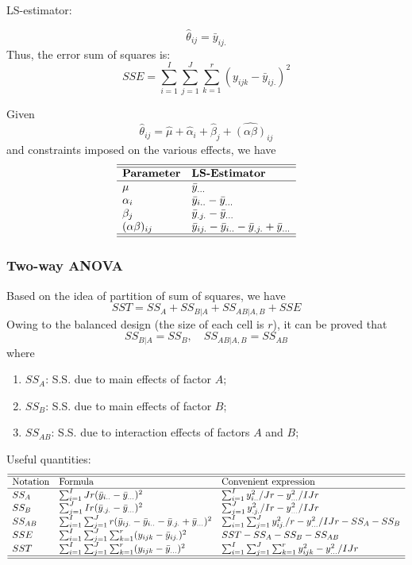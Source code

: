 \documentclass[11pt,a4paper]{article}
\begin{document}
LS-estimator: \par
\[
\hat{\theta}_{ij} = \bar{y}_{ij.}
\]
Thus, the error sum of squares is:
\[
SSE = \sum_{i=1}^{I} \sum_{j=1}^{J} \sum_{k=1}^{r} (y_{ijk} - \bar{y}_{ij.})^2
\]

Given
\[
\hat{\theta}_{ij} = \hat{\mu} + \hat{\alpha}_i + \hat{\beta}_j + \widehat{(\alpha \beta)}_{ij}
\]
and constraints imposed on the various effects, we have
\[
\begin{array}{ll}
    \hline\hline
    \textbf{Parameter} & \textbf{LS-Estimator} \\
    \hline
    \mu & \bar{y}_{...} \\
    \alpha_i & \bar{y}_{i..} - \bar{y}_{...} \\
    \beta_j & \bar{y}_{.j.} - \bar{y}_{...} \\
    (\alpha \beta)_{ij} & \bar{y}_{ij.} - \bar{y}_{i..} - \bar{y}_{.j.} + \bar{y}_{...} \\
    \hline\hline
\end{array}
\]

\subsubsection{Two-way ANOVA}
Based on the idea of partition of sum of squares, we have
\[
SST = SS_A + SS_{B|A} + SS_{AB|A,B} + SSE
\]
Owing to the balanced design (the size of each cell is $r$), it can be proved that 
\[
SS_{B|A} = SS_B, \quad SS_{AB|A,B} = SS_{AB}
\]
where
\begin{enumerate}
    \item $SS_A$: S.S. due to main effects of factor $A$;
    \item $SS_B$: S.S. due to main effects of factor $B$;
    \item $SS_{AB}$: S.S. due to interaction effects of factors $A$ and $B$;
\end{enumerate}

Useful quantities:
\[
\begin{array}{lll}
    \hline\hline
    \text{Notation} & \text{Formula} & \text{Convenient expression} \\
    \hline
    SS_A & \sum_{i=1}^{I} Jr (\bar{y}_{i..} - \bar{y}_{...})^2 & \sum_{i=1}^{I} y_{i..}^2 / Jr - y_{...}^2 / IJr \\
    SS_B & \sum_{j=1}^{J} Ir (\bar{y}_{.j.} - \bar{y}_{...})^2 & \sum_{j=1}^{J} y_{.j.}^2 / Ir - y_{...}^2 / IJr \\
    SS_{AB} & \sum_{i=1}^{I} \sum_{j=1}^{J} r (\bar{y}_{ij.} - \bar{y}_{i..} - \bar{y}_{.j.} + \bar{y}_{...})^2 & \sum_{i=1}^{I} \sum_{j=1}^{J} y_{ij.}^2 / r - y_{...}^2 / IJr - SS_A - SS_B \\
    SSE & \sum_{i=1}^{I} \sum_{j=1}^{J} \sum_{k=1}^{r} (y_{ijk} - \bar{y}_{ij.})^2 & SST - SS_A - SS_B - SS_{AB} \\
    SST & \sum_{i=1}^{I} \sum_{j=1}^{J} \sum_{k=1}^{r} (y_{ijk} - \bar{y}_{...})^2 & \sum_{i=1}^{I} \sum_{j=1}^{J} \sum_{k=1}^{r} y_{ijk}^2 - y_{...}^2 / IJr \\
    \hline\hline
\end{array}
\]
\end{document}
